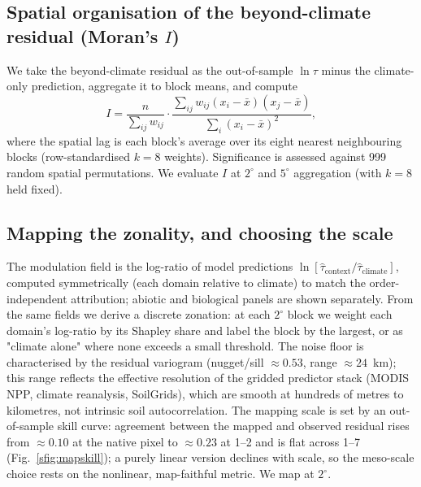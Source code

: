 \documentclass[12pt, a4paper]{article}
\begin{document}
\subsection{Spatial organisation of the beyond-climate residual (Moran's $I$)}
\label{sec:si_moran}
We take the beyond-climate residual as the out-of-sample $\ln\tau$ minus the
climate-only prediction, aggregate it to block means, and compute
\begin{equation}
  I=\frac{n}{\sum_{ij}w_{ij}}\cdot
  \frac{\sum_{ij}w_{ij}(x_i-\bar x)(x_j-\bar x)}{\sum_i (x_i-\bar x)^2},
  \label{eq:moran_si}
\end{equation}
where the spatial lag is each block's average over its eight nearest neighbouring blocks
(row-standardised $k=8$ weights). Significance is assessed against 999 random spatial
permutations. We evaluate $I$ at $2^{\circ}$ and $5^{\circ}$ aggregation (with
$k=8$ held fixed).

\subsection{Mapping the zonality, and choosing the scale}
\label{sec:si_map}
The modulation field is the log-ratio of model predictions
$\ln[\hat\tau_\text{context}/\hat\tau_\text{climate}]$, computed symmetrically (each
domain relative to climate) to match the order-independent attribution; abiotic and
biological panels are shown separately. From the same fields we derive a discrete
zonation: at each $2^{\circ}$ block we weight each domain's log-ratio by its Shapley
share and label the block by the largest, or as "climate alone" where none exceeds a
small threshold. The noise floor is characterised by the residual variogram
(nugget/sill $\approx0.53$, range $\approx24$~km); this range reflects the effective
resolution of the gridded predictor stack (MODIS NPP, climate reanalysis, SoilGrids),
which are smooth at hundreds of metres to kilometres, not intrinsic soil
autocorrelation. The mapping scale is set by an out-of-sample skill curve: agreement
between the mapped and observed residual rises from $\approx0.10$ at the native pixel to
$\approx0.23$ at 1--2\textdegree{} and is flat across 1--7\textdegree{}
(Fig.~\ref{sfig:mapskill}); a purely linear version declines with scale, so the
meso-scale choice rests on the nonlinear, map-faithful metric. We map at $2^{\circ}$.
\end{document}
